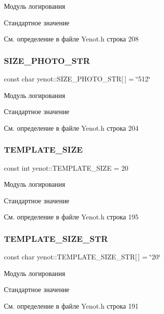 Модуль логирования

Стандартное значение 

См. определение в файле Yenot.\+h строка 208

\mbox{\label{namespaceyenot_a172f1253ba2c664d26caffab97a6253d}} 
\subsubsection{\texorpdfstring{S\+I\+Z\+E\+\_\+\+P\+H\+O\+T\+O\+\_\+\+S\+TR}{SIZE\_PHOTO\_STR}}
{\footnotesize\ttfamily const char yenot\+::\+S\+I\+Z\+E\+\_\+\+P\+H\+O\+T\+O\+\_\+\+S\+TR\mbox{[}$\,$\mbox{]} = \char`\"{}512\char`\"{}}

Модуль логирования

Стандартное значение 

См. определение в файле Yenot.\+h строка 204

\mbox{\label{namespaceyenot_a6c04317b4747d569efcf92266bb1051b}} 
\subsubsection{\texorpdfstring{T\+E\+M\+P\+L\+A\+T\+E\+\_\+\+S\+I\+ZE}{TEMPLATE\_SIZE}}
{\footnotesize\ttfamily const int yenot\+::\+T\+E\+M\+P\+L\+A\+T\+E\+\_\+\+S\+I\+ZE = 20}

Модуль логирования

Стандартное значение 

См. определение в файле Yenot.\+h строка 195

\mbox{\label{namespaceyenot_acfc97705229a010013bb0433327bf707}} 
\subsubsection{\texorpdfstring{T\+E\+M\+P\+L\+A\+T\+E\+\_\+\+S\+I\+Z\+E\+\_\+\+S\+TR}{TEMPLATE\_SIZE\_STR}}
{\footnotesize\ttfamily const char yenot\+::\+T\+E\+M\+P\+L\+A\+T\+E\+\_\+\+S\+I\+Z\+E\+\_\+\+S\+TR\mbox{[}$\,$\mbox{]} = \char`\"{}20\char`\"{}}

Модуль логирования

Стандартное значение 

См. определение в файле Yenot.\+h строка 191

